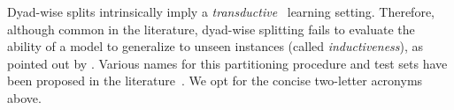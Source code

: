 \documentclass[sn-mathphys-num]{sn-jnl}%
\newcommand{\x}{\mathbf{x}}
\theoremstyle{thmstyleone}%
\theoremstyle{thmstyletwo}%
\theoremstyle{thmstylethree}%
\begin{document}

Dyad-wise splits intrinsically imply a \emph{transductive}~\cite{chapelle_semi-supervised_2006,lu_link_2011,zhou_semi-supervised_2021} learning setting.
%
Therefore, although common in the literature, dyad-wise splitting fails to evaluate the ability of a model to generalize to unseen instances (called \emph{inductiveness}), as pointed out by \cite{park_flaws_2012,schrynemackers_protocols_2013,pahikkala_toward_2015}.
Various names for this partitioning procedure and test sets have been proposed in the literature~\cite{park_flaws_2012,schrynemackers_protocols_2013,pahikkala_toward_2015,liu_neighborhood_2016,pliakos_global_2018}. We opt for the concise two-letter acronyms above.

\end{document}
